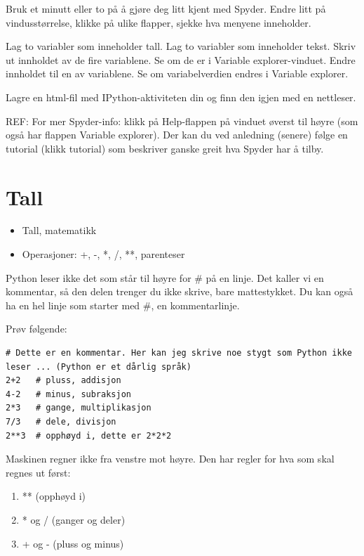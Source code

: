 {\begin{question}
Bruk et minutt eller to på å gjøre deg litt kjent med Spyder. Endre litt på vindusstørrelse, klikke på ulike flapper, sjekke hva menyene inneholder.
\end{question}
\begin{question}
Lag to variabler som inneholder tall. Lag to variabler som inneholder tekst. Skriv ut innholdet av de fire variablene. Se om de er i Variable explorer-vinduet. Endre innholdet til en av variablene. Se om variabelverdien endres i Variable explorer.
\end{question}
\begin{question}
Lagre en html-fil med IPython-aktiviteten din og finn den igjen med en nettleser.
\end{question}

REF: For mer Spyder-info: klikk på Help-flappen på vinduet øverst til høyre (som også har flappen Variable explorer). Der kan du ved anledning (senere) følge en tutorial (klikk tutorial) som beskriver ganske greit hva Spyder har å tilby.

\section{Tall}

\begin{usnintro}
\begin{itemize}
\item Tall, matematikk
\item Operasjoner: +, -, *, /, **, parenteser
\end{itemize}
\end{usnintro}

\begin{usncomment}
Python leser ikke det som står til høyre for \# på en linje. Det kaller vi en kommentar, så den delen trenger du ikke skrive, bare mattestykket. Du kan også ha en hel linje som starter med \#, en kommentarlinje.
\end{usncomment}

Prøv følgende:

\begin{lstlisting}
# Dette er en kommentar. Her kan jeg skrive noe stygt som Python ikke leser ... (Python er et dårlig språk)
2+2   # pluss, addisjon
4-2   # minus, subraksjon
2*3   # gange, multiplikasjon
7/3   # dele, divisjon
2**3  # opphøyd i, dette er 2*2*2
\end{lstlisting}

Maskinen regner ikke fra venstre mot høyre. Den har regler for hva som skal regnes ut først:
\begin{enumerate}
\item ** (opphøyd i)
\item * og / (ganger og deler)
\item + og - (pluss og minus)
\end{enumerate}

}

